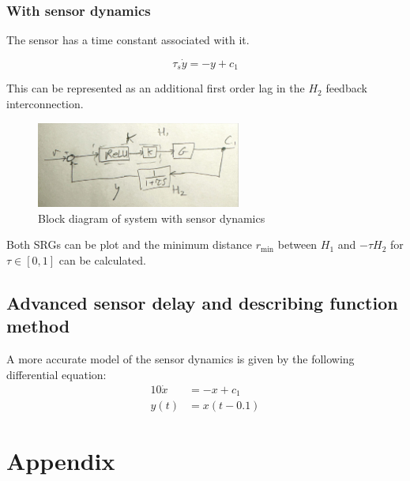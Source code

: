 \documentclass{article}
\begin{document}
\subsubsection{With sensor dynamics}

The sensor has a time constant associated with it.

\begin{equation}
    \tau_s \dot{y} = -y + c_1
\end{equation}

This can be represented as an additional first order lag in the $H_2$ feedback interconnection.

\begin{figure}[H]
    \centering
    \includegraphics[width=0.6\textwidth]{figures/sensor_dynamics.jpg}
    \caption{Block diagram of system with sensor dynamics}
    \label{fig:sensor_dynamic_block}
\end{figure}

Both SRGs can be plot and the minimum distance $r_\text{min}$ between $H_1$ and $-\tau H_2 $ for $\tau \in [0,1]$ can be calculated.

\subsection{Advanced sensor delay and describing function method}

A more accurate model of the sensor dynamics is given by the following differential equation:
\begin{align}
    10\dot{x} &= -x + c_1 \\
    y(t) &= x(t-0.1)
\end{align}

\section{Appendix}
\end{document}
